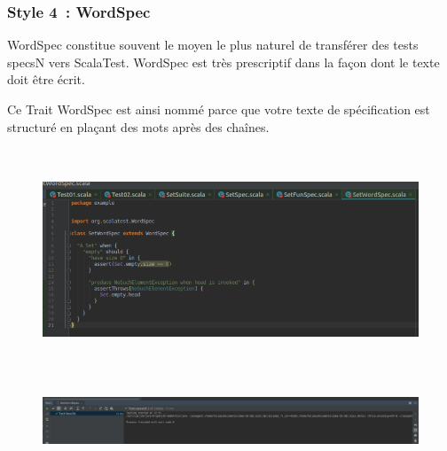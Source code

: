 \documentclass[12pt]{article}
\begin{document}

\par

\subsubsection{Style 4 : WordSpec}

\begin{justify}
WordSpec constitue souvent le moyen le plus naturel de transférer des tests specsN vers ScalaTest. WordSpec est très prescriptif dans la façon dont le texte doit être écrit. 
\end{justify}\par

Ce Trait WordSpec est ainsi nommé parce que votre texte de spécification est structuré en plaçant des mots après des chaînes.\par




\begin{figure}[H]
	\begin{Center}
		\includegraphics[width=6.3in,height=2.61in]{./media/image32.png}
	\end{Center}
\end{figure}



\par




\begin{figure}[H]
	\begin{Center}
		\includegraphics[width=6.3in,height=0.8in]{./media/image33.png}
	\end{Center}
\end{figure}
\end{document}
